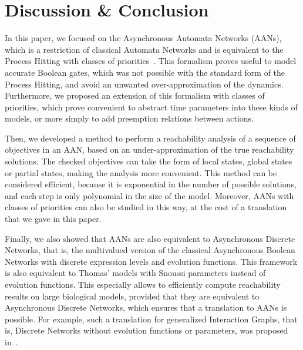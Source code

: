 \section{Discussion \& Conclusion}\label{sec:ccl}

In this paper, we focused on the Asynchronous Automata Networks (AANs),
which is a restriction of classical Automata Networks
and is equivalent to the Process Hitting with classes of priorities~\cite{FPMR13-CS2Bio}.
This formalism proves useful to model accurate Boolean gates, which was not possible
with the standard form of the Process Hitting,
and avoid an unwanted over-approximation of the dynamics.
Furthermore, we proposed an extension of this formalism with classes of priorities,
which prove convenient to abstract time parameters into these kinds of models,
or more simply to add preemption relations between actions.

Then, we developed a method to perform a reachability analysis
of a sequence of objectives in an AAN,
based on an under-approximation of the true reachability solutions.
The checked objectives can take the form of local states, global states
or partial states, making the analysis more convenient.
This method can be considered efficient,
because it is exponential in the number of possible solutions,
and each step is only polynomial in the size of the model.
Moreover, AANs with classes of priorities can also be studied in this way,
at the cost of a translation that we gave in this paper.

Finally, we also showed that AANs are also equivalent to Asynchronous Discrete Networks,
that is, the multivalued version of the classical Asynchronous Boolean Networks
with discrete expression levels and evolution functions.
This framework is also equivalent to Thomas' models with Snoussi parameters
instead of evolution functions.
This especially allows to efficiently compute reachability results
on large biological models,
provided that they are equivalent to Asynchronous Discrete Networks,
which ensures that a translation to AANs is possible.
For example,
such a translation for generalized Interaction Graphs,
that is, Discrete Networks without evolution functions or parameters,
was proposed in~\cite{PMR10-TCSB}.

